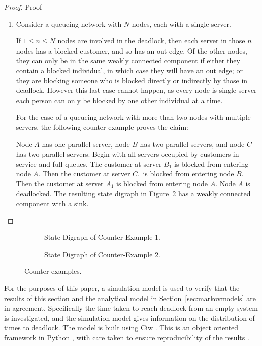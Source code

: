 \documentclass{article}
\numberwithin{equation}{section}
\begin{document}
\begin{proof}{Proof}
\begin{enumerate}
  \item
  Consider a queueing network with $N$ nodes, each with a single-server.

  If $1 \leq n \leq N$ nodes are involved in the deadlock, then each server in
  those $n$ nodes has a blocked customer, and so has an out-edge.
  Of the other nodes, they can only be in the same weakly connected component
  if either they contain a blocked individual, in which case they will have an
  out edge; or they are blocking someone who is blocked directly or indirectly
  by those in deadlock.
  However this last case cannot happen, as every node is single-server each
  person can only be blocked by one other individual at a time.

  For the case of a queueing network with more than two nodes with multiple
  servers, the following counter-example proves the claim:

  Node $A$ has one parallel server, node $B$ has two parallel servers, and
  node $C$ has two parallel servers.
  Begin with all servers occupied by customers in service and full queues.
  The customer at server $B_1$ is blocked from entering node $A$.
  Then the customer at server $C_1$ is blocked from entering node $B$.
  Then the customer at server $A_1$ is blocked from entering node $A$.
  Node $A$ is deadlocked.
  The resulting state digraph in Figure~\ref{fig:counter_example_2} has a
  weakly connected component with a sink.
  \end{enumerate}
\end{proof}

\begin{figure}
\begin{subfigure}{0.5\textwidth}
\begin{center}

\end{center}
\caption{State Digraph of Counter-Example 1.}
\label{fig:counter_example_1}
\end{subfigure}
\begin{subfigure}{0.5\textwidth}
\begin{center}

\end{center}
\caption{State Digraph of Counter-Example 2.}
\label{fig:counter_example_2}
\end{subfigure}
\caption{Counter examples.}
\label{fig:counter_examples}
\end{figure}


For the purposes of this paper, a simulation model is used to verify that the
results of this section and the analytical model in
Section~\ref{sec:markovmodels} are in agreement.
Specifically the time taken to reach deadlock from an empty system is
investigated, and the simulation model gives information on the distribution
of times to deadlock.
The model is built using Ciw \cite{ciwpython}.
This is an object oriented framework in Python \cite{python15}, with care
taken to ensure reproducibility of the results \cite{hongetal15}.
\end{document}

